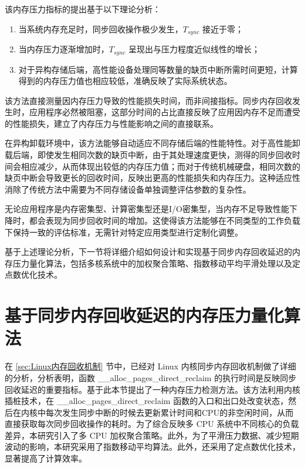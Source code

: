 该内存压力指标的提出基于以下理论分析：

\begin{enumerate}
    \item 当系统内存充足时，同步回收操作极少发生，\(T_{sync}\) 接近于零；
    \item 当内存压力逐渐增加时，\(T_{sync}\) 呈现出与压力程度近似线性的增长；
    \item 对于异构存储后端，高性能设备处理同等数量的缺页中断所需时间更短，计算得到的内存压力值也相应较低，准确反映了实际系统状态。
\end{enumerate}

该方法直接测量因内存压力导致的性能损失时间，而非间接指标。同步内存回收发生时，应用程序必然被阻塞，这部分时间的占比直接反映了应用因内存不足而遭受的性能损失，建立了内存压力与性能影响之间的直接联系。

在异构卸载环境中，该方法能够自动适应不同存储后端的性能特性。对于高性能卸载后端，即使发生相同次数的缺页中断，由于其处理速度更快，测得的同步回收时间会相应减少，从而体现出较低的内存压力值；而对于传统机械硬盘，相同次数的缺页中断会导致更长的回收时间，反映出更高的性能损失和内存压力。这种适应性消除了传统方法中需要为不同存储设备单独调整评估参数的复杂性。

无论应用程序是内存密集型、计算密集型还是I/O密集型，当内存不足导致性能下降时，都会表现为同步回收时间的增加。这使得该方法能够在不同类型的工作负载下保持一致的评估标准，无需针对特定应用类型进行定制化调整。

基于上述理论分析，下一节将详细介绍如何设计和实现基于同步内存回收延迟的内存压力量化算法，包括多核系统中的加权聚合策略、指数移动平均平滑处理以及定点数优化技术。

\section{基于同步内存回收延迟的内存压力量化算法}
\label{sec:基于同步内存回收延迟的内存压力量化算法}

在 \ref{sec:Linux内存回收机制} 节中，已经对 Linux 内核同步内存回收机制做了详细的分析，分析表明，函数 \_\_alloc\_pages\_direct\_reclaim 的执行时间是反映同步回收延迟的重要指标。基于此本节提出了一种内存压力检测方法。该方法利用内核插桩技术，在 \_\_alloc\_pages\_direct\_reclaim 函数的入口和出口处改变状态，然后在内核中每次发生同步中断的时候去更新累计时间和CPU的非空闲时间，从而直接获取每次同步回收操作的耗时。为了综合反映多 CPU 系统中不同核心的负载差异，本研究引入了多 CPU 加权聚合策略。此外，为了平滑压力数据、减少短期波动的影响，本研究采用了指数移动平均算法。此外，还采用了定点数优化技术，显著提高了计算效率。

